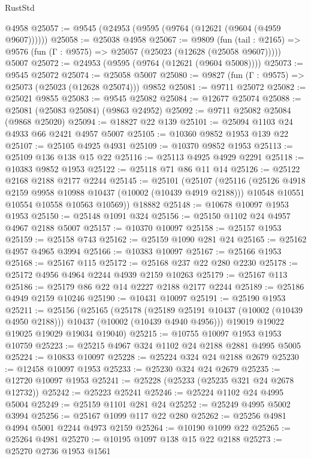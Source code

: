 \begin{lexlean}{RustStd}
\begin{coremodule}
    @4958
@25057 := @9545 (@24953 (@9595 (@9764 (@12621 (@9604 (@4959 @9607))))))
@25058 := @25038 @4958
@25067 := @9809
    (fun (tail : @2165) => @9576 (fun (Γ : @9575) => @25057 (@25023 (@12628 (@25058 @9607)))))
    @5007
@25072 := @24953 (@9595 (@9764 (@12621 (@9604 @5008))))
@25073 := @9545 @25072
@25074 := @25058 @5007
@25080 := @9827 (fun (Γ : @9575) => @25073 (@25023 (@12628 @25074))) @9852
@25081 := @9711 @25072
@25082 := @25021 @9855
@25083 := @9545 @25082
@25084 := @12677 @25074
@25088 := @25081 (@25083 @25084) (@9863 @24952)
@25092 := @9711 @25082 @25084 (@9868 @25020)
@25094 := @18827 @22 @139
@25101 := @25094 @1103 @24 @4933 @66 @2421 @4957 @5007
@25105 := @10360 @9852 @1953 @139 @22
@25107 := @25105 @4925 @4931
@25109 := @10370 @9852 @1953
@25113 := @25109 @136 @138 @15 @22
@25116 := @25113 @4925 @4929 @2291
@25118 := @10383 @9852 @1953
@25122 := @25118 @71 @86 @11 @14
@25126 := @25122 @2168 @2188 @2177 @2244
@25145 := @25101
    (@25107
      (@25116
        (@25126 @4918 @2159 @9958 @10988 @10437 (@10002 (@10439 @4919 @2188)))
        @10548
        @10551
        @10554
        @10558
        @10563
        @10569))
    @18882
@25148 := @10678 @10097 @1953 @1953
@25150 := @25148 @1091 @324
@25156 := @25150 @1102 @24 @4957 @4967 @2188 @5007
@25157 := @10370 @10097
@25158 := @25157 @1953
@25159 := @25158 @743
@25162 := @25159 @1090 @281 @24
@25165 := @25162 @4957 @4965 @3994
@25166 := @10383 @10097
@25167 := @25166 @1953
@25168 := @25167 @115
@25172 := @25168 @237 @22 @280 @2230
@25178 := @25172 @4956 @4964 @2244 @4939 @2159 @10263
@25179 := @25167 @113
@25186 := @25179 @86 @22 @14 @2227 @2188 @2177 @2244
@25189 := @25186 @4949 @2159 @10246
@25190 := @10431 @10097
@25191 := @25190 @1953
@25211 := @25156
    (@25165
      (@25178
        (@25189 @25191 @10437 (@10002 (@10439 @4950 @2188)))
        @10437
        (@10002 (@10439 @4940 @4956)))
      @19019
      @19022
      @19025
      @19029
      @19034
      @19040)
@25215 := @10755 @10097 @1953 @1953 @10759
@25223 := @25215 @4967 @324 @1102 @24 @2188 @2881 @4995 @5005
@25224 := @10833 @10097
@25228 := @25224 @324 @24 @2188 @2679
@25230 := @12458 @10097 @1953
@25233 := @25230 @324 @24 @2679
@25235 := @12720 @10097 @1953
@25241 := @25228 (@25233 (@25235 @321 @24 @2678 @12732))
@25242 := @25223 @25241
@25246 := @25224 @1102 @24 @4995 @5004
@25249 := @25159 @1101 @281 @24
@25252 := @25249 @4995 @5002 @3994
@25256 := @25167 @1099 @117 @22 @280
@25262 := @25256 @4981 @4994 @5001 @2244 @4973 @2159
@25264 := @10190 @1099 @22
@25265 := @25264 @4981
@25270 := @10195 @1097 @138 @15 @22 @2188
@25273 := @25270 @2736 @1953 @1561

\end{coremodule}
\end{lexlean}
